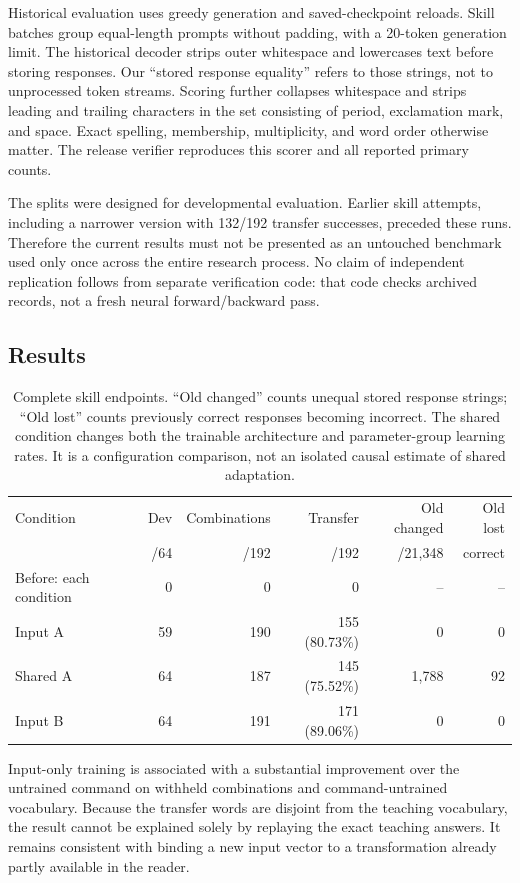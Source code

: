 \documentclass[11pt]{article}
\begin{document}
Historical evaluation uses greedy generation and saved-checkpoint reloads. Skill batches group equal-length prompts without padding, with a 20-token generation limit. The historical decoder strips outer whitespace and lowercases text before storing responses. Our ``stored response equality'' refers to those strings, not to unprocessed token streams. Scoring further collapses whitespace and strips leading and trailing characters in the set consisting of period, exclamation mark, and space. Exact spelling, membership, multiplicity, and word order otherwise matter. The release verifier reproduces this scorer and all reported primary counts.

The splits were designed for developmental evaluation. Earlier skill attempts, including a narrower version with 132/192 transfer successes, preceded these runs. Therefore the current results must not be presented as an untouched benchmark used only once across the entire research process. No claim of independent replication follows from separate verification code: that code checks archived records, not a fresh neural forward/backward pass.

\subsection{Results}
\begin{table}[htbp]
\centering\small
\begin{tabular}{lrrrrr}
\toprule
Condition & Dev & Combinations & Transfer & Old changed & Old lost\\
 & /64 & /192 & /192 & /21,348 & correct\\
\midrule
Before: each condition &0&0&0&--&--\\
Input A &59&190&155 (80.73\%)&0&0\\
Shared A &64&187&145 (75.52\%)&1,788&92\\
Input B &64&191&171 (89.06\%)&0&0\\
\bottomrule
\end{tabular}
\caption{Complete skill endpoints. ``Old changed'' counts unequal stored response strings; ``Old lost'' counts previously correct responses becoming incorrect. The shared condition changes both the trainable architecture and parameter-group learning rates. It is a configuration comparison, not an isolated causal estimate of shared adaptation.}
\label{tab:skill}
\end{table}

Input-only training is associated with a substantial improvement over the untrained command on withheld combinations and command-untrained vocabulary. Because the transfer words are disjoint from the teaching vocabulary, the result cannot be explained solely by replaying the exact teaching answers. It remains consistent with binding a new input vector to a transformation already partly available in the reader.
\end{document}
